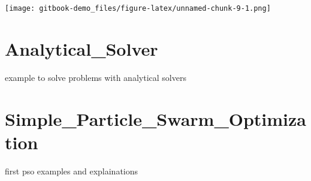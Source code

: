 \documentclass[
  oneside]{book}
\begin{document}
\texttt{[image: gitbook-demo\_files/figure-latex/unnamed-chunk-9-1.png]}

\hypertarget{analytical_solver}{%
\chapter{Analytical\_Solver}\label{analytical_solver}}

example to solve problems with analytical solvers

\hypertarget{simple_particle_swarm_optimization}{%
\chapter{Simple\_Particle\_Swarm\_Optimization}\label{simple_particle_swarm_optimization}}

first pso examples and explainations

  
\end{document}
